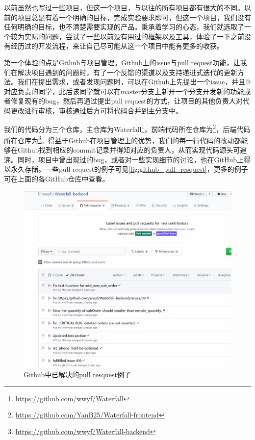 以前虽然也写过一些项目，但这一个项目，与以往的所有项目都有很大的不同。以前的项目总是有着一个明确的目标，完成实验要求即可，但这一个项目，我们没有任何明确的目标，也不清楚需要实现的产品。秉承着学习的心态，我们就选取了一个较为实际的问题，尝试了一些以前没有用过的框架以及工具，体验了一下之前没有经历过的开发流程，来让自己尽可能从这一个项目中能有更多的收获。

第一个体验的点是Github与项目管理。Github上的issue与pull request功能，让我们在解决项目遇到的问题时，有了一个反馈的渠道以及支持递进式迭代的更新方法。我们在提出需求，或者发现问题时，可以在Github上先提出一个issue，并且@对应负责的同学，此后该同学就可以在master分支上新开一个分支开发新的功能或者修复现有的bug，然后再通过提出pull request的方式，让项目的其他负责人对代码更改进行审核，审核通过后方可将代码合并到主分支中。

我们的代码分为三个仓库，主仓库为Waterfall\footnote{\url{https://github.com/wwyf/Waterfall}}，前端代码所在仓库为\footnote{\url{https://github.com/YanB25/Waterfall-frontend}}，后端代码所在仓库为\footnote{\url{https://github.com/wwyf/Waterfall-backend}}。得益于Github在项目管理上的优势，我们的每一行代码的改动都能够在Github找到相应的commit记录并得知对应的负责人，从而实现代码源头可追溯。同时，项目中曾出现过的bug，或者对一些实现细节的讨论，也在GitHub上得以永久存储。一些pull request的例子可见\autoref{fig:github_pull_resquest}，更多的例子可在上面的各GitHub仓库中查看。

\begin{figure}[htp]
    \centering
    \includegraphics[width=12cm]{report/figure/appendix2/appendix2_github.png}
    \caption{Github中已解决的pull resquest例子}
    \label{fig:github_pull_resquest}
\end{figure}

